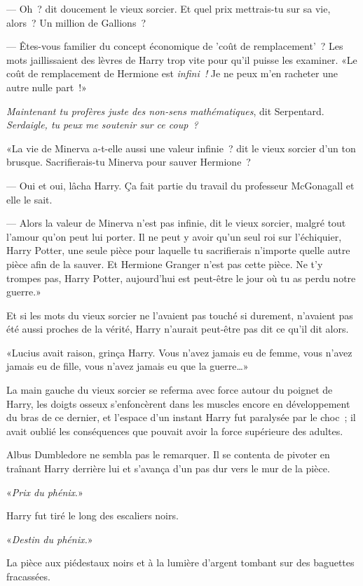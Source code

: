 --- Oh~? dit doucement le vieux sorcier. Et quel prix mettrais-tu sur sa vie, alors~? Un million de Gallions~?

--- Êtes-vous familier du concept économique de 'coût de remplacement'~? Les mots jaillissaient des lèvres de Harry trop vite pour qu'il puisse les examiner. «Le coût de remplacement de Hermione est \emph{infini~!} Je ne peux m'en racheter une autre nulle part~!»

\emph{Maintenant tu profères juste des non-sens mathématiques}, dit Serpentard. \emph{Serdaigle, tu peux me soutenir sur ce coup~?}

«La vie de Minerva a-t-elle aussi une valeur infinie~? dit le vieux sorcier d'un ton brusque. Sacrifierais-tu Minerva pour sauver Hermione~?

--- Oui et oui, lâcha Harry. Ça fait partie du travail du professeur McGonagall et elle le sait.

--- Alors la valeur de Minerva n'est pas infinie, dit le vieux sorcier, malgré tout l'amour qu'on peut lui porter. Il ne peut y avoir qu'un seul roi sur l'échiquier, Harry Potter, une seule pièce pour laquelle tu sacrifierais n'importe quelle autre pièce afin de la sauver. Et Hermione Granger n'est pas cette pièce. Ne t'y trompes pas, Harry Potter, aujourd'hui est peut-être le jour où tu as perdu notre guerre.»

Et si les mots du vieux sorcier ne l'avaient pas touché si durement, n'avaient pas été aussi proches de la vérité, Harry n'aurait peut-être pas dit ce qu'il dit alors.

«Lucius avait raison, grinça Harry. Vous n'avez jamais eu de femme, vous n'avez jamais eu de fille, vous n'avez jamais eu que la guerre…»

La main gauche du vieux sorcier se referma avec force autour du poignet de Harry, les doigts osseux s'enfoncèrent dans les muscles encore en développement du bras de ce dernier, et l'espace d'un instant Harry fut paralysée par le choc~; il avait oublié les conséquences que pouvait avoir la force supérieure des adultes.

Albus Dumbledore ne sembla pas le remarquer. Il se contenta de pivoter en traînant Harry derrière lui et s'avança d'un pas dur vers le mur de la pièce.

«\emph{Prix du phénix}.»

Harry fut tiré le long des escaliers noirs.

«\emph{Destin du phénix.}»

La pièce aux piédestaux noirs et à la lumière d'argent tombant sur des baguettes fracassées.

